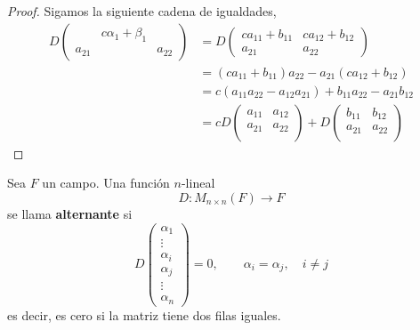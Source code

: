 \documentclass[12pt,a4paper]{book}
\begin{document}
    \begin{proof}
        Sigamos la siguiente cadena de igualdades,
        \begin{align*}
            D
            \begin{pmatrix}
                & c\alpha_{1} + \beta_{1}&\\            
                a_{21}& & a_{22}
            \end{pmatrix} & = 
            D
            \begin{pmatrix}
                ca_{11} + b_{11} & ca_{12} + b_{12}\\
                a_{21} & a_{22}
            \end{pmatrix}\\
            & = (ca_{11} + b_{11})a_{22} - a_{21}(ca_{12} + b_{12})\\
            & = c(a_{11}a_{22} - a_{12}a_{21}) + b_{11}a_{22} - a_{21}b_{12}\\[6pt]
            & = c D\begin{pmatrix}
                a_{11} & a_{12}\\
                a_{21} & a_{22}\\
            \end{pmatrix} + D
            \begin{pmatrix}
                b_{11} & b_{12}\\
                a_{21} & a_{22}\\
            \end{pmatrix}
        \end{align*}
    \end{proof}

    \vspace{1.4cm}

    \begin{definicion}
    \label{def:33}
        Sea $F$ un campo. Una función $n$-lineal
        \begin{equation*}
        D: M_{n \times n}(F) \longrightarrow F
        \end{equation*}
        se llama \textbf{alternante} si
        \begin{equation*}
        D
        \begin{pmatrix}
            \alpha_{1}\\
            \vdots\\
            \alpha_{i}\\
            \alpha_{j}\\
            \vdots\\
            \alpha_{n}
        \end{pmatrix} = 0, \qquad \alpha_{i} = \alpha_{j},\quad i \neq j
        \end{equation*}
        es decir, es cero si la matriz tiene dos filas iguales.
    \end{definicion}
\end{document}
